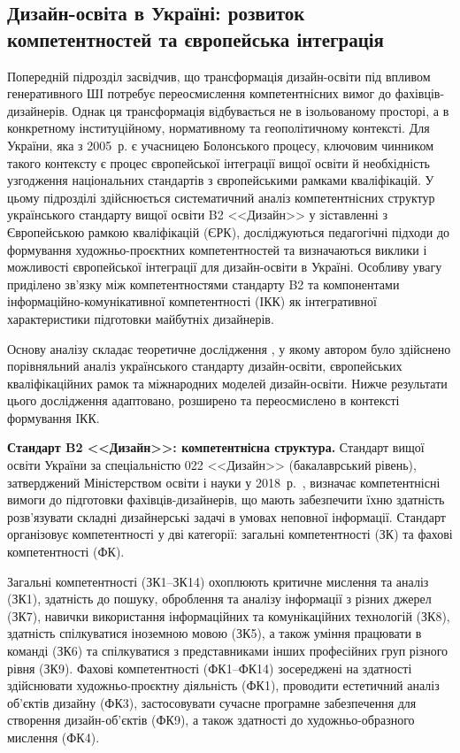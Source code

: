 \subsection{Дизайн-освіта в Україні: розвиток компетентностей та європейська інтеграція}\label{subsec:1.3}

Попередній підрозділ засвідчив, що трансформація дизайн-освіти під впливом генеративного ШІ потребує переосмислення компетентнісних вимог до фахівців-дизайнерів. Однак ця трансформація відбувається не в ізольованому просторі, а в конкретному інституційному, нормативному та геополітичному контексті. Для України, яка з 2005~р. є учасницею Болонського процесу, ключовим чинником такого контексту є процес європейської інтеграції вищої освіти й необхідність узгодження національних стандартів з європейськими рамками кваліфікацій. У цьому підрозділі здійснюється систематичний аналіз компетентнісних структур українського стандарту вищої освіти B2 <<Дизайн>> у зіставленні з Європейською рамкою кваліфікацій (ЄРК), досліджуються педагогічні підходи до формування художньо-проєктних компетентностей та визначаються виклики і можливості європейської інтеграції для дизайн-освіти в Україні. Особливу увагу приділено зв'язку між компетентностями стандарту B2 та компонентами інформаційно-комунікативної компетентності (ІКК) як інтегративної характеристики підготовки майбутніх дизайнерів.

Основу аналізу складає теоретичне дослідження \cite{Musiienko2025DesignEducation}, у якому автором було здійснено порівняльний аналіз українського стандарту дизайн-освіти, європейських кваліфікаційних рамок та міжнародних моделей дизайн-освіти. Нижче результати цього дослідження адаптовано, розширено та переосмислено в контексті формування ІКК.

\textbf{Стандарт B2 <<Дизайн>>: компетентнісна структура.} Стандарт вищої освіти України за спеціальністю 022 <<Дизайн>> (бакалаврський рівень), затверджений Міністерством освіти і науки у 2018~р.~\cite{MON2018}, визначає компетентнісні вимоги до підготовки фахівців-дизайнерів, що мають забезпечити їхню здатність розв'язувати складні дизайнерські задачі в умовах неповної інформації. Стандарт організовує компетентності у дві категорії: загальні компетентності (ЗК) та фахові компетентності (ФК).

Загальні компетентності (ЗК1--ЗК14) охоплюють критичне мислення та аналіз (ЗК1), здатність до пошуку, оброблення та аналізу інформації з різних джерел (ЗК7), навички використання інформаційних та комунікаційних технологій (ЗК8), здатність спілкуватися іноземною мовою (ЗК5), а також уміння працювати в команді (ЗК6) та спілкуватися з представниками інших професійних груп різного рівня (ЗК9). Фахові компетентності (ФК1--ФК14) зосереджені на здатності здійснювати художньо-проєктну діяльність (ФК1), проводити естетичний аналіз об'єктів дизайну (ФК3), застосовувати сучасне програмне забезпечення для створення дизайн-об'єктів (ФК9), а також здатності до художньо-образного мислення (ФК4).

